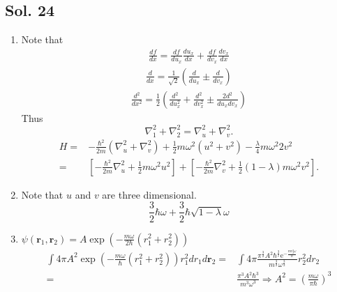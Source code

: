 \subsection*{Sol. 24}
\begin{enumerate}
    \item
    Note that 
    \begin{align*}
        \frac{df}{dx} = \frac{df}{du_x}\frac{du_x}{dx} + \frac{df}{dv_x}\frac{dv_x}{dx}
    \end{align*}
    \begin{align*}
        \frac{d}{dx} = \frac{1}{\sqrt{2}}\left(
        \frac{d}{du_x}\pm\frac{d}{dv_x}
        \right)
    \end{align*}
    \begin{align*}
        \frac{d^2}{dx^2} = \frac{1}{2}\left(
        \frac{d^2}{du^2_x}+\frac{d^2}{dv^2_x}
        \pm\frac{2d^2}{du_xdv_x}
        \right)
    \end{align*}
    Thus 
    $$
    \nabla^2_1 + \nabla_2^2 = \nabla_u^2 + \nabla^2_v.
    $$
    \begin{align*}
        H = &
        -\frac{\hbar^2}{2m}(\nabla^2_u+\nabla^2_v)
        +\frac{1}{2}m\omega^2
        (u^2+v^2)
        -\frac{\lambda}{4}m\omega^2 
        2v^2\\
        =&
        \left[
        -\frac{\hbar^2}{2m}\nabla^2_u + \frac{1}{2}m\omega^2u^2
        \right]
        +\left[
        -\frac{\hbar^2}{2m}\nabla^2_v + \frac{1}{2}(1-\lambda)
        m\omega^2v^2
        \right].
    \end{align*}
    \item Note that $u$ and $v$ are three dimensional.
    $$
    \frac{3}{2}\hbar\omega  + \frac{3}{2}\hbar\sqrt{1-\lambda}\omega
    $$
    \item
    $\psi(\bm r_1,\bm r_2)=A 
    \exp\left(
    -\frac{m\omega}{2\hbar}(r_1^2+r_2^2)
    \right)
    $
    \begin{align*}
        \int 4\pi A^2
        \exp\left(
    -\frac{m\omega}{\hbar}(r_1^2+r_2^2)
    \right)
    r_1^2
    dr_1
    d\bm r_2
    =&
    \int 4\pi
    \frac{\pi^{\frac{3}{2}} A^{2} \hbar^{\frac{3}{2}} \mathrm{e}^{-\frac{mr_{2}^{2} {\omega}}{\hbar}}}{m^{\frac{3}{2}} {\omega}^{\frac{3}{2}}}
    r_2^2dr_2\\
    =&
    \frac{\pi^{3} A^{2} \hbar^{3}}{m^{3} {\omega}^{3}}
    \Rightarrow 
    A^2 = 
    \left(\frac{m\omega}{\pi\hbar}\right)^3
    \end{align*}


\end{enumerate}
